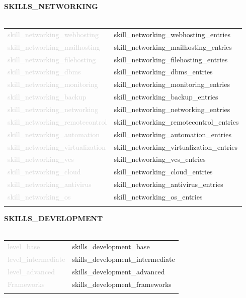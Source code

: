 \documentclass{article}
\begin{document}
\textbf{\textcolor{deepblue}{\uppercase{{{skills_networking}}}}} \\\\ \hfill
\begin{tabular}{ R{4cm} L{11cm} }
	\textcolor{lightgray}{{{skill_networking_webhosting}}} & {{skill_networking_webhosting_entries}} \\ \hfill
	\textcolor{lightgray}{{{skill_networking_mailhosting}}} & {{skill_networking_mailhosting_entries}} \\ \hfill
	\textcolor{lightgray}{{{skill_networking_filehosting}}} & {{skill_networking_filehosting_entries}} \\ \hfill
	\textcolor{lightgray}{{{skill_networking_dbms}}} & {{skill_networking_dbms_entries}} \\ \hfill
	\textcolor{lightgray}{{{skill_networking_monitoring}}} & {{skill_networking_monitoring_entries}} \\ \hfill
	\textcolor{lightgray}{{{skill_networking_backup}}} & {{skill_networking_backup_entries}} \\ \hfill
	\textcolor{lightgray}{{{skill_networking_networking}}} & {{skill_networking_networking_entries}} \\ \hfill
	\textcolor{lightgray}{{{skill_networking_remotecontrol}}} & {{skill_networking_remotecontrol_entries}} \\ \hfill
	\textcolor{lightgray}{{{skill_networking_automation}}} & {{skill_networking_automation_entries}} \\ \hfill
	\textcolor{lightgray}{{{skill_networking_virtualization}}} & {{skill_networking_virtualization_entries}} \\ \hfill
	\textcolor{lightgray}{{{skill_networking_vcs}}} & {{skill_networking_vcs_entries}} \\ \hfill
	\textcolor{lightgray}{{{skill_networking_cloud}}} & {{skill_networking_cloud_entries}} \\ \hfill
	\textcolor{lightgray}{{{skill_networking_antivirus}}} & {{skill_networking_antivirus_entries}} \\ \hfill
	\textcolor{lightgray}{{{skill_networking_os}}} & {{skill_networking_os_entries}} \\ \hfill
\end{tabular}

\textbf{\textcolor{deepblue}{\uppercase{{{skills_development}}}}} \\\\ \hfill
\begin{tabular}{ R{4cm} L{11cm} }
	\textcolor{lightgray}{{{level_base}}} & {{skills_development_base}} \\ \hfill
	\textcolor{lightgray}{{{level_intermediate}}} & {{skills_development_intermediate}} \\ \hfill
	\textcolor{lightgray}{{{level_advanced}}} & {{skills_development_advanced}} \\[.5cm] \hfill
	\textcolor{lightgray}{Frameworks} & {{skills_development_frameworks}} \\ \hfill
\end{tabular}
\end{document}

